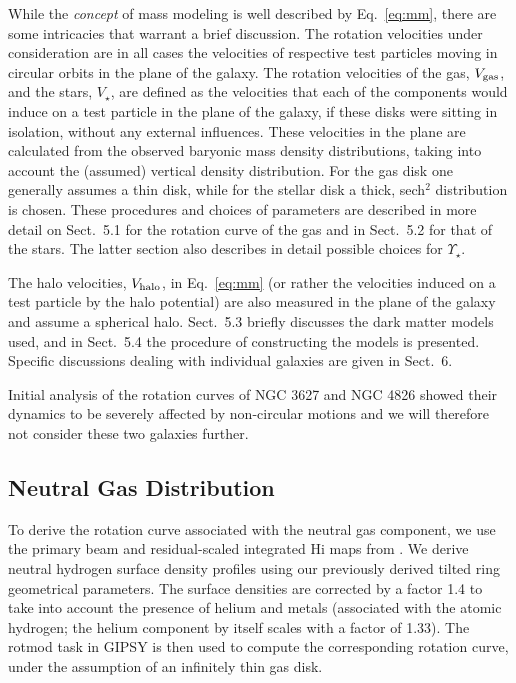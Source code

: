 \documentclass[usenatbib,usegraphicx,apjfonts,floatfix]{emulateapj}
\newcommand{\MLstar}{\ensuremath{\Upsilon_{\star}}}
\begin{document}
While the \emph{concept} of mass modeling is well described by
Eq.~\ref{eq:mm}, there are some intricacies that warrant a brief
discussion.  The rotation velocities under consideration are in all
cases the velocities of respective test particles moving in circular
orbits in the plane of the galaxy. The rotation velocities of the gas,
$V_{\rm gas}$, and the stars, $V_{\star}$, are defined as the
velocities that each of the components would induce on a test particle
in the plane of the galaxy, if these disks were sitting in isolation,
without any external influences. These velocities in the plane are
calculated from the observed baryonic mass density distributions,
taking into account the (assumed) vertical density distribution.  For
the gas disk one generally assumes a thin disk, while for the stellar
disk a thick, sech$^2$ distribution is chosen.  These procedures and
choices of parameters are described in more detail on Sect.~5.1 for
the rotation curve of the gas and in Sect.~5.2 for that of the
stars. The latter section also describes in detail possible choices
for \MLstar.

The halo velocities, $V_{\rm halo}$, in Eq.~\ref{eq:mm} (or rather the
velocities induced on a test particle by the halo potential) are also
measured in the plane of the galaxy and assume a spherical halo.
Sect.~5.3 briefly discusses the dark matter models used, and in
Sect.~5.4 the procedure of constructing the models is presented.
Specific discussions dealing with individual galaxies are given in
Sect.~6.

Initial analysis of the rotation curves of NGC 3627 and NGC 4826
showed their dynamics to be severely affected by non-circular motions
\citep{clemens2007} and  we will therefore not consider these two
galaxies further.

\subsection{Neutral Gas Distribution}

To derive the rotation curve associated with the neutral gas
component, we use the primary beam and residual-scaled integrated
H{\sc i} maps from \citet{THINGS1}. We derive neutral hydrogen surface
density profiles using our previously derived tilted ring geometrical
parameters. The surface densities are corrected by a factor 1.4 to
take into account the presence of helium and metals (associated with
the atomic hydrogen; the helium component by itself scales with a
factor of 1.33).  The {\sc rotmod} task in GIPSY is then used to
compute the corresponding rotation curve, under the assumption of an
infinitely thin gas disk.
\end{document}
